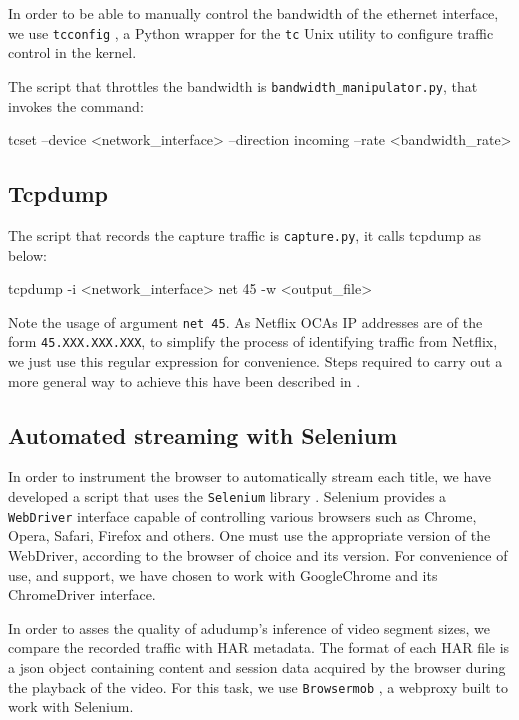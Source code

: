 In order to be able to manually control the bandwidth of the ethernet
interface, we use \texttt{tcconfig} \cite{tcconfig}, a Python wrapper for the
\texttt{tc} \cite{tc} Unix utility to configure traffic control in the kernel.

The script that throttles the bandwidth is \texttt{bandwidth\_manipulator.py},
that invokes the command:

\begin{bash_script}[caption={Enforce a bandwidth rate on the specified interface}, label={tcconfig}]
tcset --device <network_interface> --direction incoming --rate <bandwidth_rate>
\end{bash_script}

\subsection{Tcpdump}

The script that records the capture traffic is \texttt{capture.py}, it calls
tcpdump as below:

\begin{bash_script}[caption={Listens for TCP/IP traffic on the specified
    interface}, label={tcpdump}]
tcpdump -i <network_interface> net 45 -w <output_file>
\end{bash_script}

Note the usage of argument \texttt{net 45}. As Netflix OCAs IP addresses are of
the form \texttt{45.XXX.XXX.XXX}, to simplify the process of identifying
traffic from Netflix, we just use this regular expression for convenience.
Steps required to carry out a more general way to achieve this have been
described in .

\subsection{Automated streaming with Selenium}

In order to instrument the browser to automatically stream each title, we have
developed a script that uses the \texttt{Selenium} library \cite{selenium}.
Selenium provides a \texttt{WebDriver} interface capable of controlling various
browsers such as Chrome, Opera, Safari, Firefox and others. One must use the
appropriate version of the WebDriver, according to the browser of choice and
its version. For convenience of use, and support, we have chosen to work with
GoogleChrome and its ChromeDriver interface.

In order to asses the quality of adudump's inference of video segment sizes, we
compare the recorded traffic with HAR \cite{har} metadata. The format of each
HAR file is a json object containing content and session data acquired by the
browser during the playback of the video. For this task, we use
\texttt{Browsermob} \cite{browsermob}, a webproxy built to work with Selenium.

